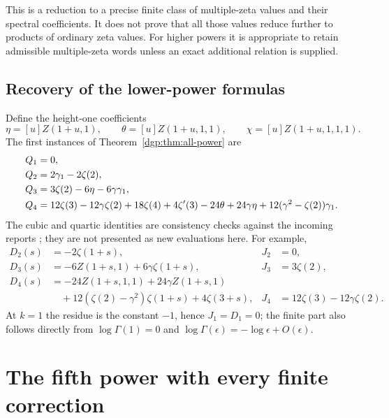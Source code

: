 This is a reduction to a precise finite class of multiple-zeta values
and their spectral coefficients.  It does not prove that all those
values reduce further to products of ordinary zeta values.  For higher
powers it is appropriate to retain admissible multiple-zeta words
unless an exact additional relation is supplied.

\subsection{Recovery of the lower-power formulas}

Define the height-one coefficients
\begin{equation}
 \eta=[u]Z(1+u,1),\qquad
 \theta=[u]Z(1+u,1,1),\qquad
 \chi=[u]Z(1+u,1,1,1).
 \label{dgp:eq:height-coefficients}
\end{equation}
The first instances of Theorem~\ref{dgp:thm:all-power} are
\begin{align}
 Q_1={}&0,\notag\\
 Q_2={}&2\gamma_1-2\zeta(2),\label{dgp:eq:Q2}\\
 Q_3={}&3\zeta(2)-6\eta-6\gamma\gamma_1,\label{dgp:eq:Q3}\\
 Q_4={}&12\zeta(3)-12\gamma\zeta(2)+18\zeta(4)+4\zeta'(3)
       -24\theta+24\gamma\eta
                  +12(\gamma^2-\zeta(2))\gamma_1.
 \label{dgp:eq:Q4}
\end{align}
The cubic and quartic identities are consistency checks against the
incoming reports \cite{dgp:reports}; they are not presented as new
evaluations here.  For example,
\begin{align*}
 D_2(s)&=-2\zeta(1+s),& J_2&=0,\\
 D_3(s)&=-6Z(1+s,1)+6\gamma\zeta(1+s),&J_3&=3\zeta(2),\\
 D_4(s)&=-24Z(1+s,1,1)+24\gamma Z(1+s,1)\\
       &\quad+12(\zeta(2)-\gamma^2)\zeta(1+s)+4\zeta(3+s),
       &J_4&=12\zeta(3)-12\gamma\zeta(2).
\end{align*}
At $k=1$ the residue is the constant $-1$, hence $J_1=D_1=0$;
the finite part also follows directly from $\log\Gamma(1)=0$ and
$\log\Gamma(\epsilon)=-\log\epsilon+O(\epsilon)$.

\section{The fifth power with every finite correction}
\label{dgp:sec:fifth}

